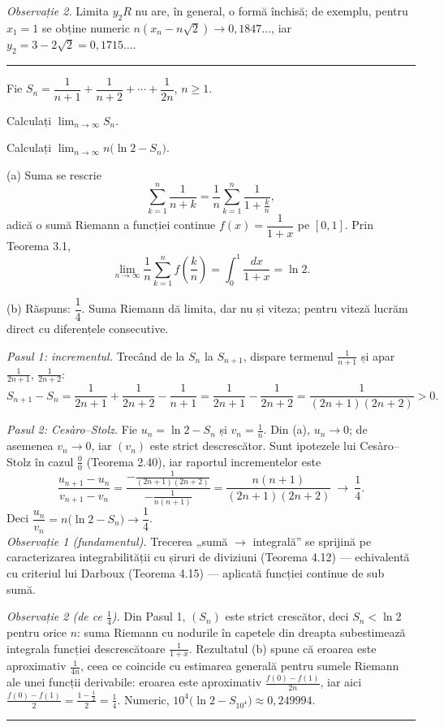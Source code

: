 \emph{Observație 2.} Limita $y_2R$ nu are, în general, o formă închisă; de exemplu, pentru $x_1=1$ se obține numeric $n(x_n-n\sqrt2)\to0{,}1847\dots$, iar $y_2=3-2\sqrt2=0{,}1715\dots$.
\vspace{1mm}\hrule

Fie $S_n=\dfrac1{n+1}+\dfrac1{n+2}+\cdots+\dfrac1{2n}$, $n\ge1$.
\begin{parti}
  \item Calculați $\displaystyle\lim_{n\to\infty}S_n$.
  \item Calculați $\displaystyle\lim_{n\to\infty}n\bigl(\ln2-S_n\bigr)$.
\end{parti}
\sol (a) Suma se rescrie
\[ \sum_{k=1}^{n}\frac{1}{n+k}=\frac1n\sum_{k=1}^{n}\frac{1}{1+\frac kn}, \]
adică o sumă Riemann a funcției continue $f(x)=\dfrac1{1+x}$ pe $[0,1]$. Prin Teorema 3.1,
\[ \lim_{n\to\infty}\frac1n\sum_{k=1}^{n}f\!\left(\frac kn\right)=\int_0^1\frac{dx}{1+x}=\ln2 . \]

(b) Răspuns: $\dfrac14$. Suma Riemann dă limita, dar nu și viteza; pentru viteză lucrăm direct cu diferențele consecutive.

\emph{Pasul 1: incrementul.} Trecând de la $S_n$ la $S_{n+1}$, dispare termenul $\frac1{n+1}$ și apar $\frac1{2n+1}$, $\frac1{2n+2}$:
\[ S_{n+1}-S_n=\frac1{2n+1}+\frac1{2n+2}-\frac1{n+1}=\frac1{2n+1}-\frac1{2n+2}=\frac{1}{(2n+1)(2n+2)}>0 . \]

\emph{Pasul 2: Cesàro--Stolz.} Fie $u_n=\ln2-S_n$ și $v_n=\frac1n$. Din (a), $u_n\to0$; de asemenea $v_n\to0$, iar $(v_n)$ este strict descrescător. Sunt ipotezele lui Cesàro--Stolz în cazul $\frac00$ (Teorema 2.40), iar raportul incrementelor este
\[ \frac{u_{n+1}-u_n}{v_{n+1}-v_n}=\frac{-\frac{1}{(2n+1)(2n+2)}}{-\frac{1}{n(n+1)}}=\frac{n(n+1)}{(2n+1)(2n+2)}\ \longrightarrow\ \frac14 . \]
Deci $\dfrac{u_n}{v_n}=n\bigl(\ln2-S_n\bigr)\to\dfrac14$.\\[2pt]
\emph{Observație 1 (fundamentul).} Trecerea „sumă $\to$ integrală'' se sprijină pe caracterizarea integrabilității cu șiruri de diviziuni (Teorema 4.12) --- echivalentă cu criteriul lui Darboux (Teorema 4.15) --- aplicată funcției continue de sub sumă.

\emph{Observație 2 (de ce $\frac14$).} Din Pasul 1, $(S_n)$ este strict crescător, deci $S_n<\ln2$ pentru orice $n$: suma Riemann cu nodurile în capetele din dreapta subestimează integrala funcției descrescătoare $\frac1{1+x}$. Rezultatul (b) spune că eroarea este aproximativ $\frac{1}{4n}$, ceea ce coincide cu estimarea generală pentru sumele Riemann ale unei funcții derivabile: eroarea este aproximativ $\frac{f(0)-f(1)}{2n}$, iar aici $\frac{f(0)-f(1)}{2}=\frac{1-\frac12}{2}=\frac14$. Numeric, $10^{4}\bigl(\ln2-S_{10^{4}}\bigr)\approx0{,}249994$.
\vspace{1mm}\hrule

